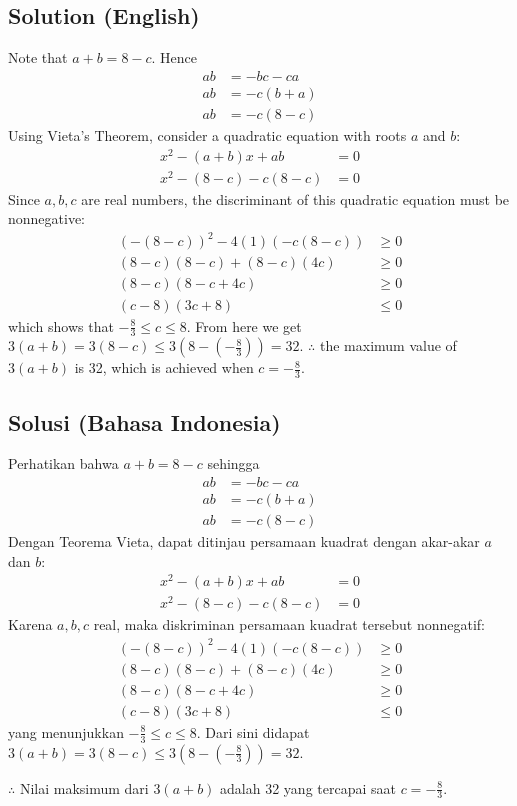 
\begin{solusi}
\subsection*{Solution (English)}
Note that $a+b = 8-c$. Hence
\begin{align*}
    ab &= -bc-ca\\
    ab &= -c(b+a)\\
    ab &= -c(8-c)
\end{align*}
Using Vieta's Theorem, consider a quadratic equation with roots $a$ and $b$:
\begin{align*}
    x^2 - (a+b)x + ab &= 0\\
    x^2 - (8-c) - c(8-c) &= 0
\end{align*}
Since $a,b,c$ are real numbers, the discriminant of this quadratic equation must be nonnegative:
\begin{align*}
    (-(8-c))^2 - 4(1)(-c(8-c)) &\ge 0\\
    (8-c)(8-c) + (8-c)(4c) &\ge 0\\
    (8-c)(8-c+4c) &\ge 0\\
    (c-8)(3c+8) &\le 0
\end{align*}
which shows that $-\frac{8}{3} \le c \le 8$.
From here we get $3(a+b) = 3(8-c) \le 3(8-(-\frac{8}{3})) = 32$.
$\therefore$ the maximum value of $3(a + b)$ is 32, which is achieved when $c=-\frac{8}{3}$.

\subsection*{Solusi (Bahasa Indonesia)}
Perhatikan bahwa $a+b = 8-c$ sehingga
\begin{align*}
    ab &= -bc-ca\\
    ab &= -c(b+a)\\
    ab &= -c(8-c)
\end{align*}
Dengan Teorema Vieta, dapat ditinjau persamaan kuadrat dengan akar-akar $a$ dan $b$:
\begin{align*}
    x^2 - (a+b)x + ab &= 0\\
    x^2 - (8-c) - c(8-c) &= 0
\end{align*}
Karena $a,b,c$ real, maka diskriminan persamaan kuadrat tersebut nonnegatif:
\begin{align*}
    (-(8-c))^2 - 4(1)(-c(8-c)) &\ge 0\\
    (8-c)(8-c) + (8-c)(4c) &\ge 0\\
    (8-c)(8-c+4c) &\ge 0\\
    (c-8)(3c+8) &\le 0
\end{align*}
yang menunjukkan $-\frac{8}{3} \le c \le 8$.
Dari sini didapat $3(a+b) = 3(8-c) \le 3(8-(-\frac{8}{3})) = 32$.

$\therefore$ Nilai maksimum dari $3(a + b)$ adalah 32 yang tercapai saat $c=-\frac{8}{3}$.
\end{solusi}